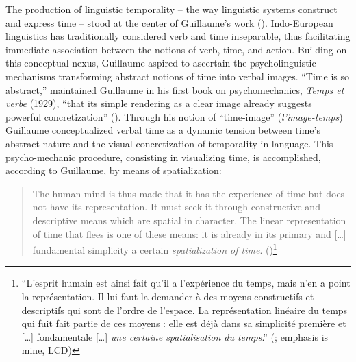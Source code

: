 \documentclass[english,output=paper,colorlinks,citecolor=brown]{../langscibook}
\begin{document}
The production of linguistic temporality -- the way linguistic systems construct and express time -- stood at the center of Guillaume’s work (\citealt{JolyLerouge1980}). Indo-European linguistics has traditionally considered verb and time inseparable, thus facilitating immediate association between the notions of verb, time, and action. Building on this conceptual nexus, Guillaume aspired to ascertain the psycholinguistic mechanisms transforming abstract notions of time into verbal images. “Time is so abstract,” maintained Guillaume in his first book on psychomechanics, \textit{Temps et verbe} (1929), “that its simple rendering as a clear image already suggests powerful concretization” (\citealt[7]{Guillaume1965Temps}). Through his notion of “time-image” (\textit{l’image-temps}) Guillaume conceptualized verbal time as a dynamic tension between time’s abstract nature and the visual concretization of temporality in language. This psycho-mechanic procedure, consisting in visualizing time, is accomplished, according to Guillaume, by means of spatialization:

\begin{quote}
    The human mind is thus made that it has the experience of time but does not have its representation. It must seek it through constructive and descriptive means which are spatial in character. The linear representation of time that flees is one of these means: it is already in its primary and […] fundamental simplicity a certain \textit{spatialization of time}. (\citealt[17]{Guillaume1965Archi})\footnote{“L'esprit humain est ainsi fait qu'il a l'expérience du temps, mais n'en a point la représentation. Il lui faut la demander à des moyens constructifs et descriptifs qui sont de l'ordre de l'espace. La représentation linéaire du temps qui fuit fait partie de ces moyens : elle est déjà dans sa simplicité première et […] fondamentale […] \textit{une certaine spatialisation du temps}.” (\citealt[17]{Guillaume1965Archi}; emphasis is mine, LCD)}
\end{quote}
\end{document}
